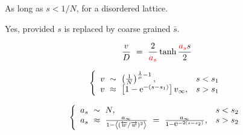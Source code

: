 \documentclass[12pt,fleqn]{seminar}
\begin{document}
\esl


\bslD




As long as $s<1/N$, for a  disordered lattice.


Yes, provided $s$ is replaced by coarse grained $\bar{s}$.



\Up


\[
\frac{v}{D} \ = \ \frac{2}{\textcolor{red}{a_s}} \tanh\frac{\textcolor{red}{a_s} s}{2}
\]


\Up


\[ 
\left\{ \begin{array}{lr}
v \ \sim  \ \left(\frac{1}{N}\right)^{\frac{1}{\mu}-1}, & s<s_1 \\
v \ \approx \ \left[1-\mbox{e}^{-(s-s_1)}\right] v_{\infty}, & s>s_1
\end{array}
\right.
\]

\Up

\[ 
\left\{ \begin{array}{lr}
a_s \ \sim \ N, & s<s_2 \\
a_s \ \approx \ \frac{a_{\infty}}{1- \left\langle (\protect\overleftarrow{w}/\protect\overrightarrow{w})^2\right\rangle}
\ = \ \frac{a_{\infty}}{1-\mbox{e}^{-2(s-s_{2})}}, & s>s_2
\end{array}
\right.
\]






\esl
\end{document}
